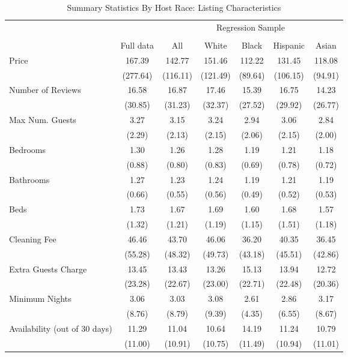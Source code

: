 \begin{table}[htbp]
\caption{Summary Statistics By Host Race: Listing Characteristics}
\begin{center}%
\small\begin{tabular}{l c | c | c c c c}
& \multicolumn{1}{c}{} & \multicolumn{5}{c}{Regression Sample}
\\
 \cmidrule(r){3-7}
\\
 & \multicolumn{1}{c}{Full data} & \multicolumn{1}{c}{All} & White & Black & Hispanic & Asian
\\
\hline\hline\noalign{\smallskip} 
 Price & 167.39 & 142.77 & 151.46 & 112.22 & 131.45 & 118.08 \\
 & (277.64) & (116.11) & (121.49) & (89.64) & (106.15) & (94.91) \\
 Number of Reviews & 16.58 & 16.87 & 17.46 & 15.39 & 16.75 & 14.23 \\
 & (30.85) & (31.23) & (32.37) & (27.52) & (29.92) & (26.77) \\
 Max Num. Guests & 3.27 & 3.15 & 3.24 & 2.94 & 3.06 & 2.84 \\
 & (2.29) & (2.13) & (2.15) & (2.06) & (2.15) & (2.00) \\
 Bedrooms & 1.30 & 1.26 & 1.28 & 1.19 & 1.21 & 1.18 \\
 & (0.88) & (0.80) & (0.83) & (0.69) & (0.78) & (0.72) \\
 Bathrooms & 1.27 & 1.23 & 1.24 & 1.19 & 1.21 & 1.19 \\
 & (0.66) & (0.55) & (0.56) & (0.49) & (0.52) & (0.53) \\
 Beds & 1.73 & 1.67 & 1.69 & 1.60 & 1.68 & 1.57 \\
 & (1.32) & (1.21) & (1.19) & (1.15) & (1.51) & (1.18) \\
 Cleaning Fee & 46.46 & 43.70 & 46.06 & 36.20 & 40.35 & 36.45 \\
 & (55.28) & (48.32) & (49.73) & (43.18) & (45.51) & (42.86) \\
 Extra Guests Charge & 13.45 & 13.43 & 13.26 & 15.13 & 13.94 & 12.72 \\
 & (23.28) & (22.67) & (23.00) & (22.71) & (22.48) & (20.36) \\
 Minimum Nights & 3.06 & 3.03 & 3.08 & 2.61 & 2.86 & 3.17 \\
 & (8.76) & (8.79) & (9.39) & (4.35) & (6.55) & (8.67) \\
 Availability (out of 30 days) & 11.29 & 11.04 & 10.64 & 14.19 & 11.24 & 10.79 \\
 & (11.00) & (10.91) & (10.75) & (11.49) & (10.94) & (11.01) \\

\end{tabular}
\end{center}
\end{table}
